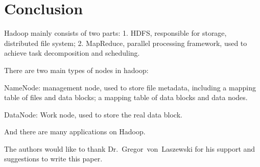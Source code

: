 \section{Conclusion}
Hadoop mainly consists of two parts: 1. HDFS, responsible for storage, distributed 
file system; 2. MapReduce, parallel processing framework, used to achieve task 
decomposition and scheduling. 

There are two main types of nodes in hadoop:

NameNode: management node, used to store file metadata, including a mapping table 
of files and data blocks; a mapping table of data blocks and data nodes.

DataNode: Work node, used to store the real data block.

And there are many applications on Hadoop.

\begin{acks}

  The authors would like to thank Dr.~Gregor~von~Laszewski for his
  support and suggestions to write this paper.

\end{acks}


 

